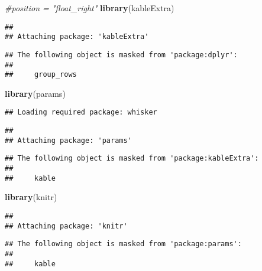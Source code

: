 \documentclass[]{article}
\newenvironment{Shaded}{\begin{snugshade}}{\end{snugshade}}
\newcommand{\KeywordTok}[1]{\textcolor[rgb]{0.13,0.29,0.53}{\textbf{#1}}}
\newcommand{\CommentTok}[1]{\textcolor[rgb]{0.56,0.35,0.01}{\textit{#1}}}
\newcommand{\NormalTok}[1]{#1}
\begin{document}
\begin{Shaded}
\begin{Highlighting}[]
\CommentTok{#position = "float_right" }
\KeywordTok{library}\NormalTok{(kableExtra)}
\end{Highlighting}
\end{Shaded}

\begin{verbatim}
## 
## Attaching package: 'kableExtra'
\end{verbatim}

\begin{verbatim}
## The following object is masked from 'package:dplyr':
## 
##     group_rows
\end{verbatim}

\begin{Shaded}
\begin{Highlighting}[]
\KeywordTok{library}\NormalTok{(params)}
\end{Highlighting}
\end{Shaded}

\begin{verbatim}
## Loading required package: whisker
\end{verbatim}

\begin{verbatim}
## 
## Attaching package: 'params'
\end{verbatim}

\begin{verbatim}
## The following object is masked from 'package:kableExtra':
## 
##     kable
\end{verbatim}

\begin{Shaded}
\begin{Highlighting}[]
\KeywordTok{library}\NormalTok{(knitr)}
\end{Highlighting}
\end{Shaded}

\begin{verbatim}
## 
## Attaching package: 'knitr'
\end{verbatim}

\begin{verbatim}
## The following object is masked from 'package:params':
## 
##     kable
\end{verbatim}
\end{document}
